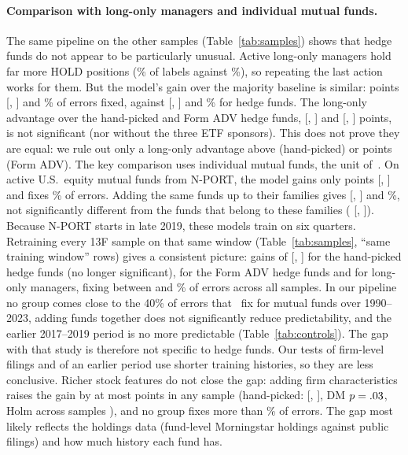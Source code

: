 \paragraph{Comparison with long-only managers and individual mutual funds.}
The same pipeline on the other samples (Table~\ref{tab:samples}) shows that
hedge funds do not appear to be particularly unusual. Active long-only managers hold far more HOLD
positions (\holdL\% of labels against \holdM\%), so repeating the last action
works for them. But the model's gain over the majority baseline is similar:
\gainL{} points [\gainloL, \gainhiL] and \errredL\% of errors fixed, against
\gainM{} [\gainloM, \gainhiM] and \errredM\% for hedge funds. The long-only
advantage over the hand-picked and Form ADV hedge funds, \diffgainM{}
[\diffgainloM, \diffgainhiM] and \diffgainA{} [\diffgainloA, \diffgainhiA]
points, is not significant (nor without the three ETF sponsors). This does not
prove they are equal: we rule out only a long-only advantage above
\diffgainhiM{} (hand-picked) or \diffgainhiA{} points (Form ADV). The key comparison uses individual
mutual funds, the unit of~\cite{cohen2026mimicking}. On \activeN{} active U.S.\
equity mutual funds from N-PORT, the model gains only \gainN{} points
[\gainloN, \gainhiN] and fixes \errredN\% of errors. Adding the same funds up
to their families gives \gainP{} [\gainloP, \gainhiP] and \errredP\%, not
significantly different from the funds that belong to these families
(\diffgainNP{} [\diffgainloNP, \diffgainhiNP]). Because N-PORT starts in late
2019, these models train on six quarters. Retraining every 13F sample on that
same window (Table~\ref{tab:samples}, ``same training window'' rows) gives a
consistent picture: gains of \shortgainM{} [\shortgainloM, \shortgainhiM] for
the hand-picked hedge funds (no longer significant), \shortgainA{} for the
Form ADV hedge funds and \shortgainL{} for long-only managers, fixing between
\shorterrmin{} and \shorterrmax\% of errors across all samples. In our
pipeline no group comes close to the 40\% of errors
that~\cite{cohen2026mimicking} fix for mutual funds over 1990--2023, adding
funds together does not significantly reduce predictability, and the earlier
2017--2019 period is no more predictable (Table~\ref{tab:controls}). The gap
with that study is therefore not specific to hedge funds. Our tests of
firm-level filings and of an earlier period use shorter training histories,
so they are less conclusive. Richer stock features do not close the gap: adding \firmn{} firm
characteristics raises the gain by at most \firmextramax{} points in any
sample (hand-picked: \firmextraM{} [\firmextraloM, \firmextrahiM], DM $p =
.03$, Holm across samples \firmholmM), and no group fixes more than
\firmerrmax\% of errors. The gap most likely reflects the holdings data
(fund-level Morningstar holdings against public filings) and how much history
each fund has.

